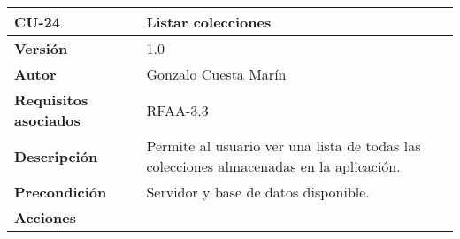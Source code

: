 \begin{longtable}[]{@{}ll@{}}
\toprule
\begin{minipage}[b]{0.16\columnwidth}\raggedright
\textbf{CU-24}\strut
\end{minipage} & \begin{minipage}[b]{0.78\columnwidth}\raggedright
\textbf{Listar colecciones}\strut
\end{minipage}\tabularnewline
\midrule
\endhead
\begin{minipage}[t]{0.16\columnwidth}\raggedright
\textbf{Versión}\strut
\end{minipage} & \begin{minipage}[t]{0.78\columnwidth}\raggedright
1.0\strut
\end{minipage}\tabularnewline
\begin{minipage}[t]{0.16\columnwidth}\raggedright
\textbf{Autor}\strut
\end{minipage} & \begin{minipage}[t]{0.78\columnwidth}\raggedright
Gonzalo Cuesta Marín\strut
\end{minipage}\tabularnewline
\begin{minipage}[t]{0.16\columnwidth}\raggedright
\textbf{Requisitos asociados}\strut
\end{minipage} & \begin{minipage}[t]{0.78\columnwidth}\raggedright
RFAA-3.3\strut
\end{minipage}\tabularnewline
\begin{minipage}[t]{0.16\columnwidth}\raggedright
\textbf{Descripción}\strut
\end{minipage} & \begin{minipage}[t]{0.78\columnwidth}\raggedright
Permite al usuario ver una lista de todas las colecciones almacenadas en
la aplicación.\strut
\end{minipage}\tabularnewline
\begin{minipage}[t]{0.16\columnwidth}\raggedright
\textbf{Precondición}\strut
\end{minipage} & \begin{minipage}[t]{0.78\columnwidth}\raggedright
Servidor y base de datos disponible.\strut
\end{minipage}\tabularnewline
\begin{minipage}[t]{0.16\columnwidth}\raggedright
\textbf{Acciones}\strut
\end{minipage} & \begin{minipage}[t]{0.78\columnwidth}\raggedright
\begin{enumerate}

\end{enumerate}
\end{minipage}
\end{longtable}
